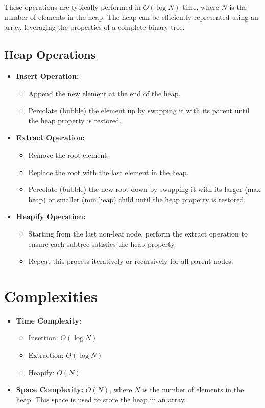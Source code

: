These operations are typically performed in \( O(\log N) \) time, where \( N \) is the number of elements in the heap. The heap can be efficiently represented using an array, leveraging the properties of a complete binary tree.

\subsection*{Heap Operations}

\begin{itemize}
    \item \textbf{Insert Operation:}
    \begin{itemize}
        \item Append the new element at the end of the heap.
        \item Percolate (bubble) the element up by swapping it with its parent until the heap property is restored.
    \end{itemize}
    
    \item \textbf{Extract Operation:}
    \begin{itemize}
        \item Remove the root element.
        \item Replace the root with the last element in the heap.
        \item Percolate (bubble) the new root down by swapping it with its larger (max heap) or smaller (min heap) child until the heap property is restored.
    \end{itemize}
    
    \item \textbf{Heapify Operation:}
    \begin{itemize}
        \item Starting from the last non-leaf node, perform the extract operation to ensure each subtree satisfies the heap property.
        \item Repeat this process iteratively or recursively for all parent nodes.
    \end{itemize}
\end{itemize}

\section*{Complexities}

\begin{itemize}
    \item \textbf{Time Complexity:}
    \begin{itemize}
        \item Insertion: \( O(\log N) \)
        \item Extraction: \( O(\log N) \)
        \item Heapify: \( O(N) \)
    \end{itemize}
    
    \item \textbf{Space Complexity:} \( O(N) \), where \( N \) is the number of elements in the heap. This space is used to store the heap in an array.
\end{itemize}

